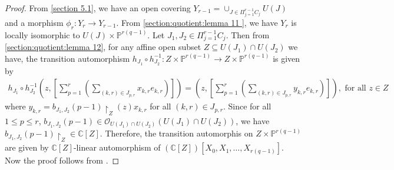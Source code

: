 \documentclass[12pt,reqno]{amsart}
\numberwithin{equation}{section}
\theoremstyle{definition}
\begin{document}
		\begin{proof}From \cref{section 5.1}, we have an open covering $Y_{r-1}=\cup_{J\in\Pi_{j=1}^{r-1}C_{j}}U(J)$ and a morphism $\phi_{r}:Y_{r}\longrightarrow Y_{r-1}$. From \cref{section:quotient:lemma 11 }, we have $Y_{r}$ is locally isomorphic to $U(J)\times\mathbb{P}^{r(q-1)}$. Let $J_{1},J_{2}\in\Pi_{j=1}^{r-1}C_{j}$. Then from \cref{section:quotient:lemma 12}, for any affine open subset $Z\subseteq U(J_{1})\cap U(J_{2})$ we have, the transition automorphism $h_{J_{1}}\circ h_{J_{2}}^{-1}:Z\times \mathbb{P}^{r(q-1)}\longrightarrow Z\times\mathbb{P}^{r(q-1)}$ is given by  
			\begin{align*}
				h_{J_{1}}\circ h_{J_{2}}^{-1}(z,[\sum_{p=1}^{r}(\sum_{(k,r)\in J_{p,r}}x_{k,r}e_{k,r})])=(z,[\sum_{p=1}^{r}(\sum_{(k,r)\in J_{p,r}}y_{k,r}e_{k,r})]), \text{ for all $z\in Z$}
			\end{align*}
		where $y_{k,r}=b_{J_{1},J_{2}}(p-1)\!\restriction_Z(z)x_{k,r}$ for all $(k,r)\in J_{p,r}$. Since for all $1\leq p\leq r$, $b_{J_{1},J_{2}}(p-1)\in \mathcal{O}_{U(J_{1})\cap U(J_{2})}(U(J_{1})\cap U(J_{2}))$, we have  $b_{J_{1},J_{2}}(p-1)\!\restriction_Z\in\mathbb{C}[Z]$. Therefore, the transition automorphis on $Z\times\mathbb{P}^{r(q-1)}$ are given by $\mathbb{C}[Z]$-linear automorphism of $(\mathbb{C}[Z])[X_{0},X_{1},\ldots,X_{r(q-1)}]$. Now the proof follows from \cite[ch.2, exercise 7.10]{Ha}.	
		\end{proof} 
\end{document}
